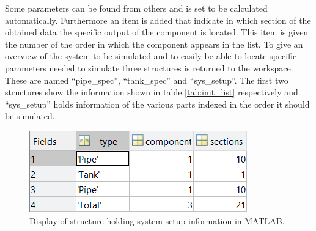 Some parameters can be found from others and is set to be calculated automatically. Furthermore an item is added that indicate in which section of the obtained data the specific output of the component is located. This item is given the number of the order in which the component appears in the list. To give an overview of the system to be simulated and to easily be able to locate specific parameters needed to simulate three structures is returned to the workspace. These are named ``pipe\_spec'', ``tank\_spec'' and ``sys\_setup''. The first two structures show the information shown in table \ref{tab:init_list} respectively and ``sys\_setup'' holds information of the  various parts indexed in the order it should be simulated.

\begin{figure}[H]
\centering
\includegraphics[width=0.5 \textwidth]{report/simulation/pictures/sys_setup_matlab.png}
\caption{Display of structure holding system setup information in MATLAB.}
\label{fig:sys_setup}
\end{figure}
